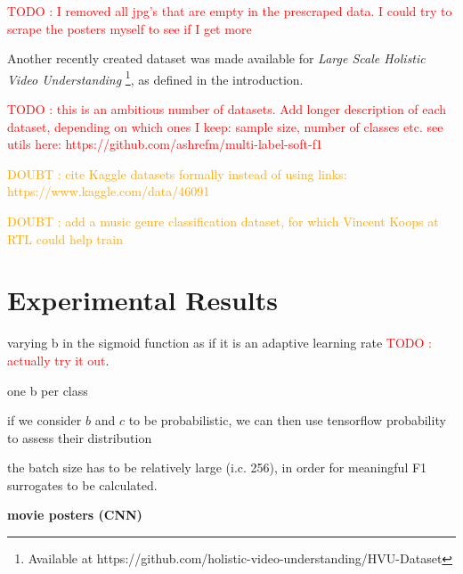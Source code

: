 \documentclass[sigconf,natbib,screen=true,review=true,anonymous]{acmart}
\newcommand\todo[1]{\textcolor{red}{TODO : #1}}
\newcommand\doubt[1]{\textcolor{orange}{DOUBT : #1}}
\begin{document}
\todo{I removed all jpg's that are empty in the prescraped data. I could try to scrape the posters myself to see if I get more}

Another recently created dataset was made available for \emph{Large Scale Holistic Video Understanding} \cite{holisticVideoData} \footnote{Available at https://github.com/holistic-video-understanding/HVU-Dataset}, as defined in the introduction.





\todo{this is an ambitious number of datasets. Add longer description of each dataset, depending on which ones I keep: sample size, number of classes etc. see utils here: https://github.com/ashrefm/multi-label-soft-f1}

\doubt{cite Kaggle datasets formally instead of using links: https://www.kaggle.com/data/46091}

\doubt{add a music genre classification dataset, for which Vincent Koops at RTL could help train}

\newpage

\section{Experimental Results}
\label{sec:org5c9864c}

varying b in the sigmoid function as if it is an adaptive learning rate \todo{actually try it out}.

one b per class

if we consider \(b\) and \(c\) to be probabilistic, we can then use tensorflow probability to assess their distribution

the batch size has to be relatively large (i.c. 256), in order for meaningful F1 surrogates to be calculated.



\textbf{movie posters (CNN)}
\end{document}
